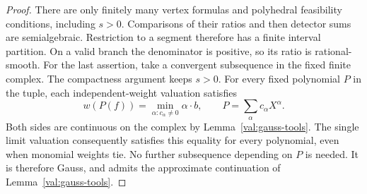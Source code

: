 \begin{proof}
There are only finitely many vertex formulas and polyhedral
feasibility conditions, including $s>0$. Comparisons of their
ratios and then detector sums are semialgebraic. Restriction to a
segment therefore has a finite interval partition. On a valid
branch the denominator is positive, so its ratio is rational-smooth.
For the last assertion, take a convergent subsequence in the fixed
finite complex. The compactness argument keeps $s>0$. For every
fixed polynomial $P$ in the tuple, each independent-weight valuation
satisfies
\[
 w(P(f))=\min_{\alpha:c_\alpha\ne0}\alpha\cdot b,
 \qquad P=\sum_\alpha c_\alpha X^\alpha.
\]
Both sides are continuous on the complex by
Lemma~\ref{val:gauss-tools}. The single limit valuation consequently
satisfies this equality for every polynomial, even when monomial
weights tie. No further subsequence depending on $P$ is needed.
It is therefore Gauss, and admits the approximate continuation of
Lemma~\ref{val:gauss-tools}.
\end{proof}
